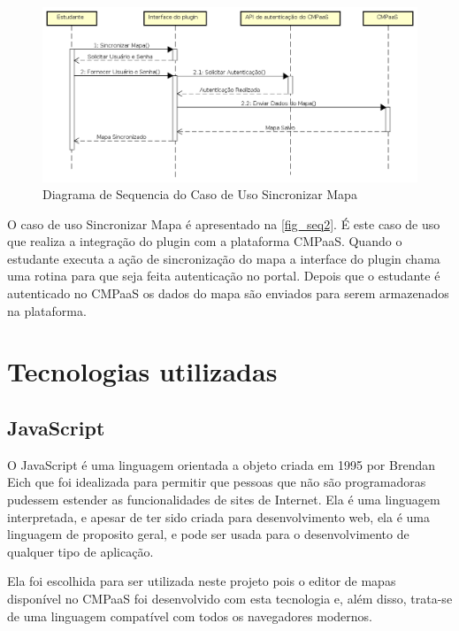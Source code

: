 \documentclass[
	12pt,				%
	openright,			%
	oneside,			%
	a4paper,			%
	english,			%
	french,				%
	spanish,			%
	brazil				%
	]{abntex2}
\begin{document}
\begin{figure}[htb]
	\caption{\label{fig_seq2} Diagrama de Sequencia do Caso de Uso Sincronizar Mapa}
	\begin{center}
		\includegraphics[scale=0.5]{SeqDiagramCmpaas.png}
	\end{center}
\end{figure} 

O caso de uso Sincronizar Mapa é apresentado na \autoref{fig_seq2}. É este caso de uso que realiza a integração do plugin com a plataforma CMPaaS. Quando o estudante executa a ação de sincronização do mapa a interface do plugin chama uma rotina para que seja feita autenticação no portal. Depois que o estudante é autenticado no CMPaaS os dados do mapa são enviados para serem armazenados na plataforma.

\section{Tecnologias utilizadas}

\subsection{JavaScript}

O JavaScript é uma linguagem orientada a objeto criada em 1995 por Brendan Eich que foi idealizada para permitir que pessoas que não são programadoras pudessem estender as funcionalidades de sites de Internet\cite{Richards2010}. Ela é uma linguagem interpretada, e apesar de ter sido criada para desenvolvimento web, ela é uma linguagem de proposito geral, e pode ser usada para o desenvolvimento de qualquer tipo de aplicação\cite{flanagan2006}.

Ela foi escolhida para ser utilizada neste projeto pois o editor de mapas disponível no CMPaaS foi desenvolvido com esta tecnologia e, além disso, trata-se de uma linguagem compatível com todos os navegadores modernos.  
\end{document}
